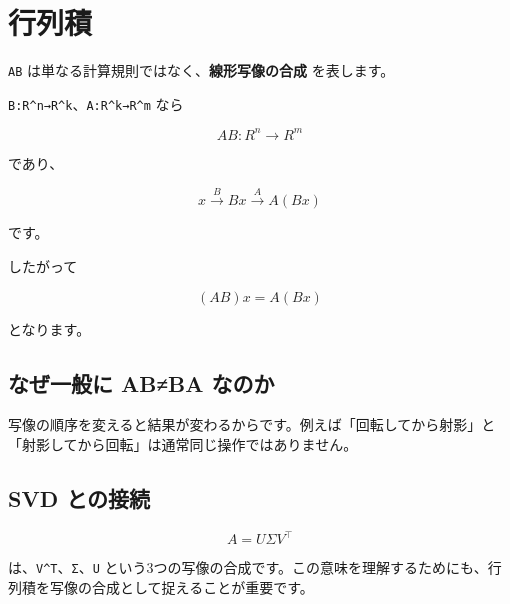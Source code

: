 \documentclass[
  11pt,
  a4paper,
]{ltjsarticle}
\author{}
\date{}
\begin{document}
\hypertarget{ux884cux5217ux7a4d}{%
\section{行列積}\label{ux884cux5217ux7a4d}}

\texttt{AB} は単なる計算規則ではなく、\textbf{線形写像の合成}
を表します。

\texttt{B:R\^{}n→R\^{}k}、\texttt{A:R\^{}k→R\^{}m} なら

\[
AB:R^n\to R^m
\]

であり、

\[
x\xrightarrow{B}Bx\xrightarrow{A}A(Bx)
\]

です。

したがって

\[
(AB)x=A(Bx)
\]

となります。

\hypertarget{ux306aux305cux4e00ux822cux306b-abba-ux306aux306eux304b}{%
\subsection{なぜ一般に AB≠BA
なのか}\label{ux306aux305cux4e00ux822cux306b-abba-ux306aux306eux304b}}

写像の順序を変えると結果が変わるからです。例えば「回転してから射影」と「射影してから回転」は通常同じ操作ではありません。

\hypertarget{svd-ux3068ux306eux63a5ux7d9a}{%
\subsection{SVD との接続}\label{svd-ux3068ux306eux63a5ux7d9a}}

\[
A=U\Sigma V^\top
\]

は、\texttt{V\^{}T}、\texttt{Σ}、\texttt{U}
という3つの写像の合成です。この意味を理解するためにも、行列積を写像の合成として捉えることが重要です。
\end{document}
